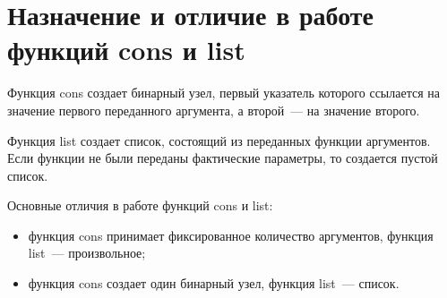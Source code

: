 \section{Назначение и отличие в работе функций cons и list}

Функция cons создает бинарный узел, первый указатель которого ссылается на значение первого переданного аргумента, а второй~--- на значение второго.

Функция list создает список, состоящий из переданных функции аргументов.
Если функции не были переданы фактические параметры, то создается пустой список.

Основные отличия в работе функций cons и list:
\begin{itemize}
	\item функция cons принимает фиксированное количество аргументов, функция list~--- произвольное;
	\item функция cons создает один бинарный узел, функция list~--- список.
\end{itemize}

\clearpage
